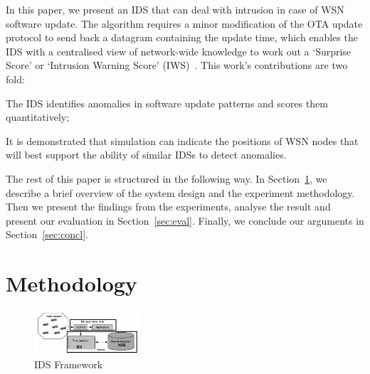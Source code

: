 \documentclass[conference]{IEEEtran}
\begin{document}
In this paper, we present an IDS that can deal with intrusion in case of WSN software update.
The algorithm requires a minor modification of the OTA update protocol to send back a datagram containing the update time, 
which enables the IDS with a centralised view of network-wide knowledge to work out a  `Surprise Score' or `Intrusion Warning Score' (IWS)~\cite{aalam14, aalam15}.
This work's contributions are two fold: 
\begin{inparaenum}
\item  The IDS identifies anomalies in software update patterns and scores them quantitatively;
\item It is demonstrated that simulation can indicate the positions of WSN nodes that will best support the ability of similar IDSs to detect anomalies.
\end{inparaenum}
The rest of this paper is structured in the following way. 
In Section~\ref{sec:meth}, we describe a brief overview of the system  design and the experiment methodology. 
Then we  present the findings from the experiments, analyse the result and present our evaluation in Section~\ref{sec:eval}.  
Finally, we conclude our arguments in Section~\ref{sec:concl}.


\section{Methodology}
\label{sec:meth}

\begin{figure}[t]
    \centering
    \includegraphics[width=0.35\textwidth]{IDS_fw}	
    \caption{IDS Framework}
    \label{fig:ids_fw}
\end{figure}
\end{document}
